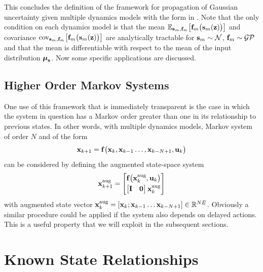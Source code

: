 This concludes the definition of the framework for propagation of Gaussian uncertainty given multiple dynamics models with the form in . Note that the only condition on each dynamics model is that the mean $\mathbb{E}_{\mathbf{s}_m,\mathbf{f}_m}\big[\mathbf{f}_m\big(\mathbf{s}_m(\mathbf{z})\big)\big]$ and covariance $\mathrm{cov}_{\mathbf{s}_m,\mathbf{f}_m}\big[\mathbf{f}_m\big(\mathbf{s}_m(\mathbf{z})\big)\big]$ are analytically tractable for $\mathbf{s}_m \sim \mathcal{N}$, $\mathbf{f}_m \sim \mathcal{GP}$ and that the mean is differentiable with respect to the mean of the input distribution $\boldsymbol{\mu}_{\mathbf{s}}$. Now some specific applications are discussed.


\subsection{Higher Order Markov Systems} \label{sec:nonmarkov}
One use of this framework that is immediately transparent is the case in which the system in question has a Markov order greater than one in its relationship to previous states. In other words, with multiple dynamics models, Markov system of order $N$ and of the form
\begin{equation*}
\mathbf{x}_{k+1} = \mathbf{f}\big(\mathbf{x}_{k},\mathbf{x}_{k-1}\dots,\mathbf{x}_{k-N+1},\mathbf{u}_{k}\big)
\end{equation*}
can be considered by defining the augmented state-space system
\begin{equation*}
\mathbf{x}^{\text{aug}}_{k+1} = \begin{bmatrix}  \mathbf{f}\big(\mathbf{x}^{\text{aug}}_{k},\mathbf{u}_{k}\big) \\[0.1cm] 
\begin{bmatrix} \mathbf{I} & \mathbf{0} \end{bmatrix} \mathbf{x}^{\text{aug}}_{k}
 \end{bmatrix}
\end{equation*}
with augmented state vector $\mathbf{x}^{\text{aug}}_k = [\mathbf{x}_{k}; \mathbf{x}_{k-1} \dots  \mathbf{x}_{k-N+1}] \in \mathbb{R}^{NE}$. Obviously a similar procedure could be applied if the system also depends on delayed actions. This is a useful property that we will exploit in the subsequent sections.







\section{Known State Relationships}

